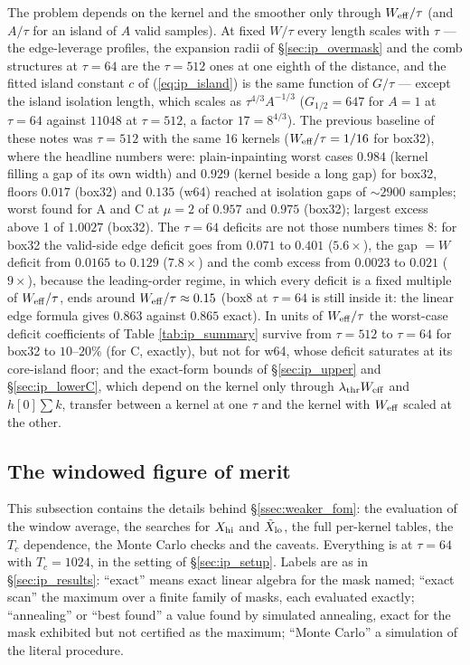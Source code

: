 \documentclass{article}
\numberwithin{equation}{section}   %
\begin{document}
The problem depends on the kernel and the smoother only through $W_{\rm eff}/\tau$ (and $A/\tau$ for an
island of $A$ valid samples).  At fixed $W/\tau$ every length scales with $\tau$ --- the edge-leverage
profiles, the expansion radii of \S\ref{sec:ip_overmask} and the comb structures at $\tau = 64$ are the
$\tau = 512$ ones at one eighth of the distance, and the fitted island constant $c$ of
(\ref{eq:ip_island}) is the same function of $G/\tau$ --- except the island isolation length, which
scales as $\tau^{4/3}A^{-1/3}$ ($G_{1/2} = 647$ for $A = 1$ at $\tau = 64$ against $11048$ at
$\tau = 512$, a factor $17 = 8^{4/3}$).  The previous baseline of these notes was $\tau = 512$ with the
same 16 kernels ($W_{\rm eff}/\tau = 1/16$ for box32), where the headline numbers were: plain-inpainting
worst cases $0.984$ (kernel filling a gap of its own width) and $0.929$ (kernel beside a long gap) for
box32, floors $0.017$ (box32) and $0.135$ (w64) reached at isolation gaps of $\sim 2900$ samples; worst
found for A and C at $\mu = 2$ of $0.957$ and $0.975$ (box32); largest excess above 1 of $1.0027$
(box32).  The $\tau = 64$ deficits are not those numbers times $8$: for box32 the valid-side edge deficit
goes from $0.071$ to $0.401$ ($5.6\times$), the gap $= W$ deficit from $0.0165$ to $0.129$ ($7.8\times$)
and the comb excess from $0.0023$ to $0.021$ ($9\times$), because the leading-order regime, in which every
deficit is a fixed multiple of $W_{\rm eff}/\tau$, ends around $W_{\rm eff}/\tau \approx 0.15$ (box8 at
$\tau = 64$ is still inside it: the linear edge formula gives $0.863$ against $0.865$ exact).  In units of
$W_{\rm eff}/\tau$ the worst-case deficit coefficients of Table \ref{tab:ip_summary} survive from
$\tau = 512$ to $\tau = 64$ for box32 to $10$--$20\%$ (for C, exactly), but not for w64, whose deficit
saturates at its core-island floor; and the exact-form bounds of \S\ref{sec:ip_upper} and
\S\ref{sec:ip_lowerC}, which depend on the kernel only through $\lambda_{\rm thr}W_{\rm eff}$ and
$h[0]\sum k$, transfer between a kernel at one $\tau$ and the kernel with $W_{\rm eff}$ scaled at the
other.

\subsection{The windowed figure of merit}
\label{sec:ip_fom}

This subsection contains the details behind \S\ref{ssec:weaker_fom}: the evaluation of the window
average, the searches for $X_{\rm hi}$ and $\tilde X_{\rm lo}$, the full per-kernel tables, the $T_c$
dependence, the Monte Carlo checks and the caveats.  Everything is at $\tau = 64$ with $T_c = 1024$, in
the setting of \S\ref{sec:ip_setup}.  Labels are as in \S\ref{sec:ip_results}: ``exact'' means exact
linear algebra for the mask named; ``exact scan'' the maximum over a finite family of masks, each
evaluated exactly; ``annealing'' or ``best found'' a value found by simulated annealing, exact for the
mask exhibited but not certified as the maximum; ``Monte Carlo'' a simulation of the literal procedure.
\end{document}
